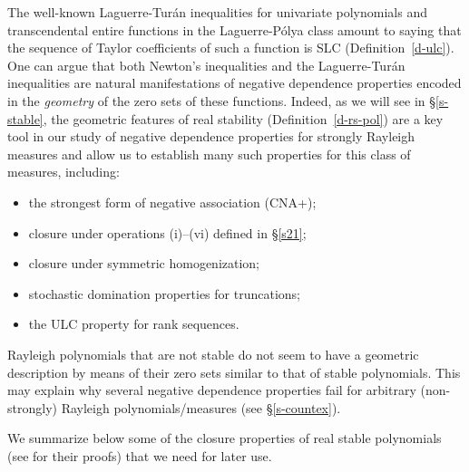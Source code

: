 \documentclass[10pt,reqno]{amsart}
\theoremstyle{plain}
\theoremstyle{definition}
\theoremstyle{remark}
\begin{document}
The well-known Laguerre-Tur\'an inequalities for univariate polynomials and 
transcendental entire functions in the Laguerre-P\'olya class \cite{CC}
amount to saying that the sequence of Taylor coefficients of such a function
is SLC (Definition~\ref{d-ulc}). 
One can argue that both Newton's inequalities and the 
Laguerre-Tur\'an inequalities are 
natural manifestations of negative dependence properties encoded in 
the {\em geometry} of the zero sets of these functions. Indeed, as we will 
see in \S \ref{s-stable}, the geometric features of real stability 
(Definition~\ref{d-rs-pol}) are a key tool in our study of negative 
dependence properties for strongly Rayleigh measures and allow us to
establish many such properties for this class of measures, including:
\begin{itemize}
\item the strongest form of negative association (CNA+);
\item closure under operations (i)--(vi) defined in \S \ref{s21};
\item closure under symmetric homogenization;
\item stochastic domination properties for truncations;
\item the ULC property for rank sequences.
\end{itemize}

Rayleigh polynomials that are not stable do not seem 
to have a geometric description by means of their zero sets similar to that
of stable polynomials. 
This may explain why several negative dependence properties fail for 
arbitrary (non-strongly) Rayleigh
polynomials/measures (see \S \ref{s-countex}).

We summarize below some of the closure properties of real stable 
polynomials (see \cite{BBS1,BBS2} for their proofs) that we need
for later use.
\end{document}
